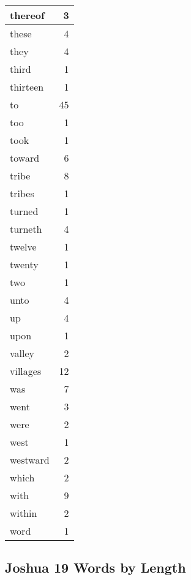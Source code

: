 \begin{center}
\begin{longtable}{l|r}
thereof & 3\\ \hline 
these & 4\\ \hline 
they & 4\\ \hline 
third & 1\\ \hline 
thirteen & 1\\ \hline 
to & 45\\ \hline 
too & 1\\ \hline 
took & 1\\ \hline 
toward & 6\\ \hline 
tribe & 8\\ \hline 
tribes & 1\\ \hline 
turned & 1\\ \hline 
turneth & 4\\ \hline 
twelve & 1\\ \hline 
twenty & 1\\ \hline 
two & 1\\ \hline 
unto & 4\\ \hline 
up & 4\\ \hline 
upon & 1\\ \hline 
valley & 2\\ \hline 
villages & 12\\ \hline 
was & 7\\ \hline 
went & 3\\ \hline 
were & 2\\ \hline 
west & 1\\ \hline 
westward & 2\\ \hline 
which & 2\\ \hline 
with & 9\\ \hline 
within & 2\\ \hline 
word & 1\\ \hline 
\end{longtable}
\end{center}





\subsection{Joshua 19 Words by Length}


\normalsize
 
